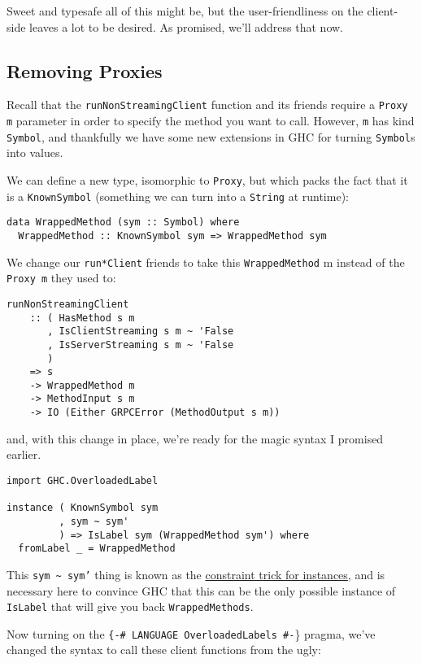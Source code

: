 {Sweet and typesafe all of this might be, but the user-friendliness on the client-side leaves a lot to be desired. As promised, we'll address that now.

\subsection{Removing Proxies}

Recall that the \texttt{runNonStreamingClient} function and its friends require a \texttt{Proxy m} parameter in order to specify the method you want to call. However, \texttt{m} has kind \texttt{Symbol}, and thankfully we have some new extensions in GHC for turning \texttt{Symbol}s into values.

We can define a new type, isomorphic to \texttt{Proxy}, but which packs the fact that it is a \texttt{KnownSymbol} (something we can turn into a \texttt{String} at runtime):

\begin{verbatim}
data WrappedMethod (sym :: Symbol) where
  WrappedMethod :: KnownSymbol sym => WrappedMethod sym
\end{verbatim}
We change our \texttt{run*Client} friends to take this \texttt{WrappedMethod} m instead of the \texttt{Proxy m} they used to:

\begin{verbatim}
runNonStreamingClient
    :: ( HasMethod s m
       , IsClientStreaming s m ~ 'False
       , IsServerStreaming s m ~ 'False
       )
    => s
    -> WrappedMethod m
    -> MethodInput s m
    -> IO (Either GRPCError (MethodOutput s m))
\end{verbatim}
and, with this change in place, we're ready for the magic syntax I promised earlier.

\begin{verbatim}
import GHC.OverloadedLabel

instance ( KnownSymbol sym
         , sym ~ sym'
         ) => IsLabel sym (WrappedMethod sym') where
  fromLabel _ = WrappedMethod
\end{verbatim}
This \texttt{sym \~{} sym'} thing is known as the \href{http://chrisdone.com/posts/haskell-constraint-trick}{constraint trick for instances}, and is necessary here to convince GHC that this can be the only possible instance of \texttt{IsLabel} that will give you back \texttt{WrappedMethods}.

Now turning on the \texttt{\{-\# LANGUAGE OverloadedLabels \#-}\} pragma, we've changed the syntax to call these client functions from the ugly:

}
